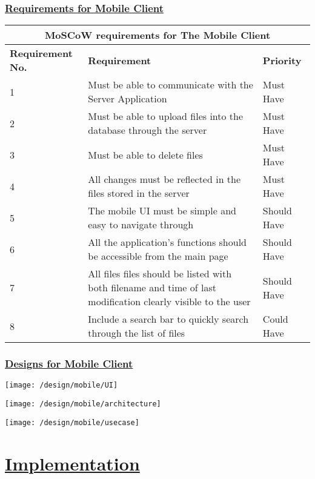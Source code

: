 \documentclass{article}
\begin{document}
\subsubsection{\underline{Requirements for Mobile Client}}
\begin{tabular}{|p{3cm}|p{5cm}|p{4cm}|}
\hline
\multicolumn{3}{|c|}{\textbf{MoSCoW requirements for The Mobile Client}} \\
\hline
\textbf{Requirement No.} & \textbf{Requirement} & \textbf{Priority}\\
\hline
1 & Must be able to communicate with the Server Application & Must Have \\
\hline
2 & Must be able to upload files into the database through the server & Must Have \\
\hline
3 & Must be able to delete files & Must Have \\
\hline
4 & All changes must be reflected in the files stored in the server & Must Have \\
\hline
5 & The mobile UI must be simple and easy to navigate through & Should Have \\
\hline
6 & All the application's functions should be accessible from the main page & Should Have \\
\hline
7 & All files files should be listed with both filename and time of last modification clearly visible to the user & Should Have \\
\hline
8 & Include a search bar to quickly search through the list of files & Could Have \\
\hline
\end{tabular}

\subsubsection{\underline{Designs for Mobile Client}}
\texttt{[image: /design/mobile/UI]}

\texttt{[image: /design/mobile/architecture]}

\texttt{[image: /design/mobile/usecase]}

\section{\underline{Implementation}}
\end{document}
